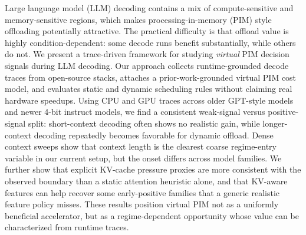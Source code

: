 Large language model (LLM) decoding contains a mix of compute-sensitive and memory-sensitive regions, which makes processing-in-memory (PIM) style offloading potentially attractive. The practical difficulty is that offload value is highly condition-dependent: some decode runs benefit substantially, while others do not. We present a trace-driven framework for studying \emph{virtual} PIM decision signals during LLM decoding. Our approach collects runtime-grounded decode traces from open-source stacks, attaches a prior-work-grounded virtual PIM cost model, and evaluates static and dynamic scheduling rules without claiming real hardware speedups. Using CPU and GPU traces across older GPT-style models and newer 4-bit instruct models, we find a consistent weak-signal versus positive-signal split: short-context decoding often shows no realistic gain, while longer-context decoding repeatedly becomes favorable for dynamic offload. Dense context sweeps show that context length is the clearest coarse regime-entry variable in our current setup, but the onset differs across model families. We further show that explicit KV-cache pressure proxies are more consistent with the observed boundary than a static attention heuristic alone, and that KV-aware features can help recover some early-positive families that a generic realistic feature policy misses. These results position virtual PIM not as a uniformly beneficial accelerator, but as a regime-dependent opportunity whose value can be characterized from runtime traces.
